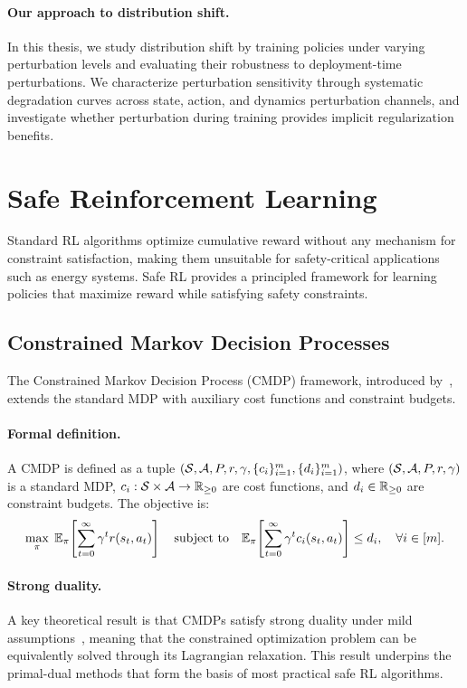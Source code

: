 \paragraph{Our approach to distribution shift.} In this thesis, we study distribution shift by training policies under varying perturbation levels and evaluating their robustness to deployment-time perturbations. We characterize perturbation sensitivity through systematic degradation curves across state, action, and dynamics perturbation channels, and investigate whether perturbation during training provides implicit regularization benefits.

\section{Safe Reinforcement Learning}
\label{sec:lit_safe}

Standard RL algorithms optimize cumulative reward without any mechanism for constraint satisfaction, making them unsuitable for safety-critical applications such as energy systems. Safe RL provides a principled framework for learning policies that maximize reward while satisfying safety constraints.

\subsection{Constrained Markov Decision Processes}

The Constrained Markov Decision Process (CMDP) framework, introduced by~\citet{altman1999constrained}, extends the standard MDP with auxiliary cost functions and constraint budgets.

\paragraph{Formal definition.} A CMDP is defined as a tuple $(\mathcal{S}, \mathcal{A}, P, r, \gamma, \{c_i\}_{i=1}^{m}, \{d_i\}_{i=1}^{m})$, where $(\mathcal{S}, \mathcal{A}, P, r, \gamma)$ is a standard MDP, $c_i: \mathcal{S} \times \mathcal{A} \to \mathbb{R}_{\geq 0}$ are cost functions, and $d_i \in \mathbb{R}_{\geq 0}$ are constraint budgets. The objective is:
\begin{equation}
    \max_{\pi} \; \mathbb{E}_{\pi}\!\left[\sum_{t=0}^{\infty} \gamma^t r(s_t, a_t)\right] \quad \text{subject to} \quad \mathbb{E}_{\pi}\!\left[\sum_{t=0}^{\infty} \gamma^t c_i(s_t, a_t)\right] \leq d_i, \quad \forall i \in [m].
\end{equation}

\paragraph{Strong duality.} A key theoretical result is that CMDPs satisfy strong duality under mild assumptions~\citep{altman1999constrained}, meaning that the constrained optimization problem can be equivalently solved through its Lagrangian relaxation. This result underpins the primal-dual methods that form the basis of most practical safe RL algorithms.

